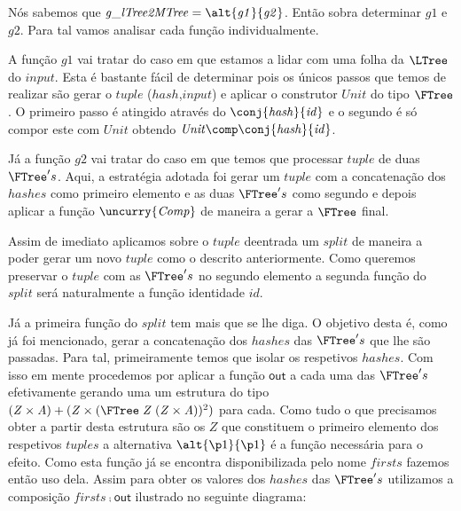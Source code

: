 \documentclass[a4paper]{article}
\newcommand{\Conid}[1]{\mathit{#1}}
\newcommand{\Varid}[1]{\mathit{#1}}
\begin{document}
Nós sabemos que $\ensuremath{\Varid{g\char95 lTree2MTree}\mathrel{=}\alt{\Varid{g1}}{\Varid{g2}}}$. Então sobra determinar $\ensuremath{\Varid{g1}}$ e $\ensuremath{\Varid{g2}}$. Para tal vamos analisar
cada função individualmente.

A função $\ensuremath{\Varid{g1}}$ vai tratar do caso em que estamos a lidar com uma folha da $\ensuremath{{\LTree}}$ do $input$. Esta é bastante 
fácil de determinar pois os únicos passos que temos de realizar são gerar o $tuple$ ($hash$,$input$) e aplicar o
construtor $\ensuremath{\Conid{Unit}}$ do tipo $\ensuremath{{\FTree}}$. O primeiro passo é atingido através do $\ensuremath{\conj{\Varid{hash}}{\Varid{id}}}$ e o segundo é só compor 
este com $\ensuremath{\Conid{Unit}}$ obtendo $\ensuremath{\Conid{Unit}\comp \conj{\Varid{hash}}{\Varid{id}}}$.

Já a função $\ensuremath{\Varid{g2}}$ vai tratar do caso em que temos que processar $tuple$ de duas $\ensuremath{{\FTree}}'s$. Aqui, a estratégia adotada
foi gerar um $tuple$ com a concatenação dos $hashes$ como primeiro elemento e as duas $\ensuremath{{\FTree}}'s$ como segundo e depois
aplicar a função $\ensuremath{\uncurry{\Conid{Comp}}}$ de maneira a gerar a $\ensuremath{{\FTree}}$ final. 

Assim de imediato aplicamos sobre o $tuple$ deentrada um $split$ de maneira a poder gerar um novo $tuple$ como o 
descrito anteriormente. Como queremos preservar o $tuple$ com as $\ensuremath{{\FTree}}'s$ no segundo elemento a segunda função 
do $split$ será naturalmente a função identidade $id$. 

Já a primeira função do $split$ tem mais que se lhe diga. O objetivo desta é, como já foi mencionado, gerar 
a concatenação dos $hashes$ das $\ensuremath{{\FTree}}'s$ que lhe são passadas. Para tal, primeiramente temos que isolar os
respetivos $hashes$. Com isso em mente procedemos por aplicar a função $\ensuremath{\mathsf{out}}$ a cada uma das $\ensuremath{{\FTree}}'s$
efetivamente gerando uma um estrutura do tipo $\ensuremath{(\Conid{Z}\times\Conid{A})\mathbin{+}(\Conid{Z}\times({\FTree}\;\Conid{Z}\;(\Conid{Z}\times\Conid{A}))}^2)$ para cada. Como tudo o que 
precisamos obter a partir desta estrutura são os $Z$ que constituem o primeiro elemento dos respetivos $tuples$ a 
alternativa $\ensuremath{\alt{\p1}{\p1}}$ é a função necessária para o efeito. Como esta função já se encontra disponibilizada pelo 
nome $\ensuremath{\Varid{firsts}}$ fazemos então uso dela. Assim para obter os valores dos $hashes$ das $\ensuremath{{\FTree}}'s$ utilizamos a composição 
$\ensuremath{\Varid{firsts}\comp \mathsf{out}}$ ilustrado no seguinte diagrama:
\end{document}

